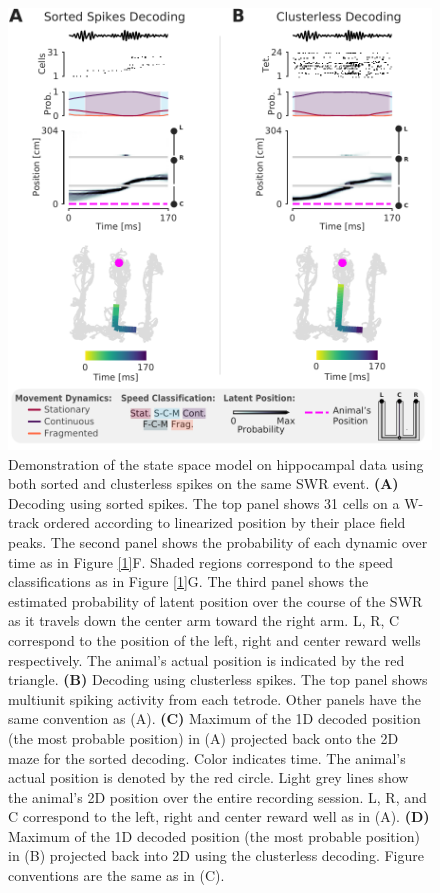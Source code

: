 \documentclass[times, twoside]{zHenriquesLab-StyleBioRxiv}
\begin{document}
\begin{figure}%
\centering
\includegraphics[width=0.80\linewidth]{figures/Figure2/Figure2_v5}
\caption{Demonstration of the state space model on hippocampal data using both sorted and clusterless spikes on the same SWR event. \textbf{(A)} Decoding using sorted spikes. The top panel shows 31 cells on a W-track ordered according to linearized position by their place field peaks. The second panel shows the probability of each dynamic over time as in Figure \ref{1}F. Shaded regions correspond to the speed classifications as in Figure \ref{1}G. The third panel shows the estimated probability of latent position over the course of the SWR as it travels down the center arm toward the right arm. L, R, C correspond to the position of the left, right and center reward wells respectively. The animal's actual position is indicated by the red triangle. \textbf{(B)} Decoding using clusterless spikes. The top panel shows multiunit spiking activity from each tetrode. Other panels have the same convention as (A).  \textbf{(C)} Maximum of the 1D decoded position (the most probable position) in (A) projected back onto the 2D maze for the sorted decoding. Color indicates time. The animal's actual position is denoted by the red circle. Light grey lines show the animal's 2D position over the entire recording session. L, R, and C correspond to the left, right and center reward well as in (A). \textbf{(D)} Maximum of the 1D decoded position (the most probable position) in (B) projected back into 2D using the clusterless decoding. Figure conventions are the same as in (C).
}
\label{2}
\end{figure}
\end{document}
